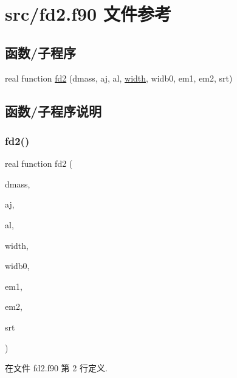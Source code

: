\hypertarget{fd2_8f90}{}\section{src/fd2.f90 文件参考}
\label{fd2_8f90}
\subsection*{函数/子程序}
\begin{DoxyCompactItemize}
\item 
real function \mbox{\hyperlink{fd2_8f90_a7f6e9cf572c13e1d90b79be2f7fb6e3f}{fd2}} (dmass, aj, al, \mbox{\hyperlink{width_8f90_ad87dba8131333d4eb15220ebfac774e8}{width}}, widb0, em1, em2, srt)
\end{DoxyCompactItemize}


\subsection{函数/子程序说明}
\mbox{\label{fd2_8f90_a7f6e9cf572c13e1d90b79be2f7fb6e3f}} 
\subsubsection{\texorpdfstring{fd2()}{fd2()}}
{\footnotesize\ttfamily real function fd2 (\begin{DoxyParamCaption}\item[{}]{dmass,  }\item[{}]{aj,  }\item[{}]{al,  }\item[{}]{width,  }\item[{}]{widb0,  }\item[{}]{em1,  }\item[{}]{em2,  }\item[{}]{srt }\end{DoxyParamCaption})}



在文件 fd2.\+f90 第 2 行定义.

